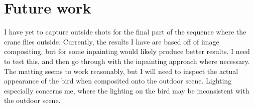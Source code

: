 \documentclass[12pt]{article}
\begin{document}
	\section{Future work}
		I have yet to capture outside shots for the final part of the sequence where the crane flies outside.  Currently, the results I have are based off of image compositing, but for some inpainting would likely produce better results.  I need to test this, and then go through with the inpainting approach where necessary.  The matting seems to work reasonably, but I will need to inspect the actual appearance of the bird when composited onto the outdoor scene.  Lighting especially concerns me, where the lighting on the bird may be inconsistent with the outdoor scene.
\end{document}
